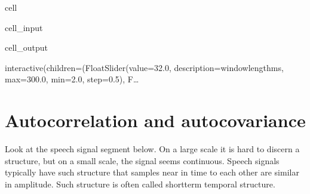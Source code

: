 \documentclass[letterpaper,10pt,english]{jupyterBook}
\begin{document}
\begin{sphinxuseclass}{cell}
\begin{sphinxVerbatimInput}
\begin{sphinxuseclass}{cell_input}
\begin{sphinxVerbatim}[commandchars=\\\{\}]
      
  \PYG{p}{[}\PYG{p}{]}
  
\end{sphinxVerbatim}

\end{sphinxuseclass}\end{sphinxVerbatimInput}
\begin{sphinxVerbatimOutput}

\begin{sphinxuseclass}{cell_output}
\begin{sphinxVerbatim}[commandchars=\\\{\}]
interactive(children=(FloatSlider(value=32.0, description=\PYGZsq{}window\PYGZus{}length\PYGZus{}ms\PYGZsq{}, max=300.0, min=2.0, step=0.5), F…
\end{sphinxVerbatim}

\end{sphinxuseclass}\end{sphinxVerbatimOutput}

\end{sphinxuseclass}
\sphinxstepscope


\section{Autocorrelation and autocovariance}
\label{\detokenize{Representations/Autocorrelation_and_autocovariance:autocorrelation-and-autocovariance}}\label{\detokenize{Representations/Autocorrelation_and_autocovariance::doc}}
\sphinxAtStartPar
Look at the speech signal segment below. On a large scale it is
hard to discern a structure, but on a small scale, the signal seems
continuous. Speech signals typically have such structure that samples
near in time to each other are similar in amplitude. Such structure is
often called short\sphinxhyphen{}term temporal structure.
\end{document}
